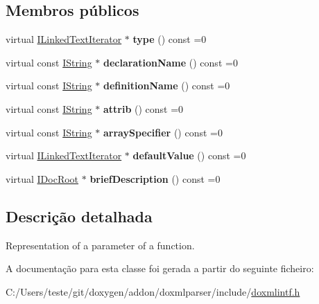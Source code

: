 \subsection*{Membros públicos}
\begin{DoxyCompactItemize}
\item 
\hypertarget{class_i_param_a5b2b394697f0afec4166e6342738dfab}{virtual \hyperlink{class_i_linked_text_iterator}{I\-Linked\-Text\-Iterator} $\ast$ {\bfseries type} () const =0}\label{class_i_param_a5b2b394697f0afec4166e6342738dfab}

\item 
\hypertarget{class_i_param_a5afabdd4ed864a2015701be4bd867071}{virtual const \hyperlink{class_i_string}{I\-String} $\ast$ {\bfseries declaration\-Name} () const =0}\label{class_i_param_a5afabdd4ed864a2015701be4bd867071}

\item 
\hypertarget{class_i_param_a2a9d02bc1b22c13af3ac0c2faacaadc3}{virtual const \hyperlink{class_i_string}{I\-String} $\ast$ {\bfseries definition\-Name} () const =0}\label{class_i_param_a2a9d02bc1b22c13af3ac0c2faacaadc3}

\item 
\hypertarget{class_i_param_a1c3c75f558f642af1140392dbcaf971e}{virtual const \hyperlink{class_i_string}{I\-String} $\ast$ {\bfseries attrib} () const =0}\label{class_i_param_a1c3c75f558f642af1140392dbcaf971e}

\item 
\hypertarget{class_i_param_a5830df6c6e87ec3fda3c0a6c56969668}{virtual const \hyperlink{class_i_string}{I\-String} $\ast$ {\bfseries array\-Specifier} () const =0}\label{class_i_param_a5830df6c6e87ec3fda3c0a6c56969668}

\item 
\hypertarget{class_i_param_a3aad025c280f7585e695ce282a0aac89}{virtual \hyperlink{class_i_linked_text_iterator}{I\-Linked\-Text\-Iterator} $\ast$ {\bfseries default\-Value} () const =0}\label{class_i_param_a3aad025c280f7585e695ce282a0aac89}

\item 
\hypertarget{class_i_param_a8a0da25a8851dfb809394c4d6585efb2}{virtual \hyperlink{class_i_doc_root}{I\-Doc\-Root} $\ast$ {\bfseries brief\-Description} () const =0}\label{class_i_param_a8a0da25a8851dfb809394c4d6585efb2}

\end{DoxyCompactItemize}


\subsection{Descrição detalhada}
Representation of a parameter of a function. 

A documentação para esta classe foi gerada a partir do seguinte ficheiro\-:\begin{DoxyCompactItemize}
\item 
C\-:/\-Users/teste/git/doxygen/addon/doxmlparser/include/\hyperlink{include_2doxmlintf_8h}{doxmlintf.\-h}\end{DoxyCompactItemize}
